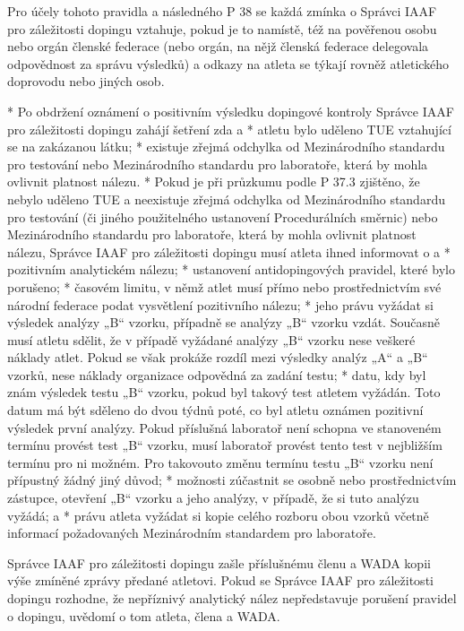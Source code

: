 Pro účely tohoto pravidla a následného P 38 se každá zmínka o Správci IAAF pro záležitosti dopingu vztahuje, pokud je to namístě, též na pověřenou osobu nebo orgán členské federace (nebo orgán, na nějž členská federace delegovala odpovědnost za správu výsledků) a odkazy na atleta se týkají rovněž atletického doprovodu nebo jiných osob.

* Po obdržení oznámení o positivním výsledku dopingové kontroly Správce IAAF pro záležitosti dopingu zahájí šetření zda
  \begitems \style a
  * atletu bylo uděleno TUE vztahující se na zakázanou látku;
  * existuje zřejmá odchylka od Mezinárodního standardu pro testování nebo Mezinárodního standardu pro laboratoře, která by mohla ovlivnit platnost nálezu.
  \enditems
* Pokud je při průzkumu podle P 37.3 zjištěno, že nebylo uděleno TUE a neexistuje zřejmá odchylka od Mezinárodního standardu pro testování (či jiného použitelného ustanovení Procedurálních směrnic) nebo Mezinárodního standardu pro laboratoře, která by mohla ovlivnit platnost nálezu, Správce IAAF pro záležitosti dopingu musí atleta ihned informovat o
  \begitems \style a
  * pozitivním analytickém nálezu;
  * ustanovení antidopingových pravidel, které bylo porušeno;
  * časovém limitu, v němž atlet musí přímo nebo prostřednictvím své národní federace podat vysvětlení pozitivního nálezu;
  * jeho právu vyžádat si výsledek analýzy „B“ vzorku, případně se analýzy „B“ vzorku vzdát. Současně musí atletu sdělit, že v případě vyžádané analýzy „B“ vzorku nese veškeré náklady atlet. Pokud se však prokáže rozdíl mezi výsledky analýz „A“ a „B“ vzorků, nese náklady organizace odpovědná za zadání testu;
  * datu, kdy byl znám výsledek testu „B“ vzorku, pokud byl takový test atletem vyžádán. Toto datum má být sděleno do dvou týdnů poté, co byl atletu oznámen pozitivní výsledek první analýzy. Pokud příslušná laboratoř není schopna ve stanoveném termínu provést test „B“ vzorku, musí laboratoř provést tento test v nejbližším termínu pro ni možném. Pro takovouto změnu termínu testu „B“ vzorku není přípustný žádný jiný důvod;
  * možnosti zúčastnit se osobně nebo prostřednictvím zástupce, otevření „B“ vzorku a jeho analýzy, v případě, že si tuto analýzu vyžádá; a
  * právu atleta vyžádat si kopie celého rozboru obou vzorků včetně informací požadovaných Mezinárodním standardem pro laboratoře.
  \enditems

Správce IAAF pro záležitosti dopingu zašle příslušnému členu a WADA kopii výše zmíněné zprávy předané atletovi. Pokud se Správce IAAF pro záležitosti dopingu rozhodne, že nepříznivý analytický nález nepředstavuje porušení pravidel o dopingu, uvědomí o tom atleta, člena a WADA.

